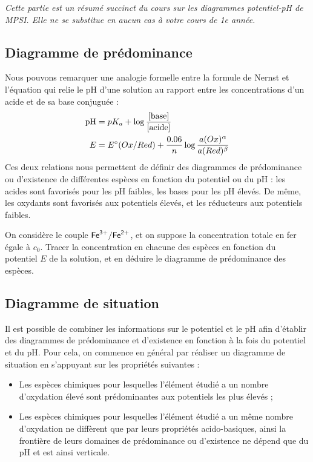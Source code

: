 \documentclass[11pt,fleqn]{book} %
\begin{document}
\textit{Cette partie est un résumé succinct du cours sur les diagrammes potentiel-pH de MPSI. Elle ne se substitue en aucun cas à votre cours de 1e année.}

\subsection{Diagramme de prédominance}

Nous pouvons remarquer une analogie formelle entre la formule de Nernst et l'équation qui relie le pH d'une solution au rapport entre les concentrations d'un acide et de sa base conjuguée :
\begin{align}
	\mathrm{pH} &= pK_a + \log \frac{[\mathrm{base}]}{[{\rm acide}]} \\
	E &= E^\circ(Ox/Red) + \frac{0.06}{n} \log \frac{ a(Ox)^\alpha}{a(Red)^\beta}
\end{align}
Ces deux relations nous permettent de définir des diagrammes de prédominance ou d'existence de différentes espèces en fonction du potentiel ou du pH : les acides sont favorisés pour les pH faibles, les bases pour les pH élevés. De même, les oxydants sont favorisés aux potentiels élevés, et les réducteurs aux potentiels faibles.

\begin{capex}
	On considère le couple $\ce{Fe^{3+}}/\ce{Fe^{2+}}$, et on suppose la concentration totale en fer égale à $c_0$. Tracer la concentration en chacune des espèces en fonction du potentiel $E$ de la solution, et en déduire le diagramme de prédominance des espèces.
\end{capex}

\subsection{Diagramme de situation}

Il est possible de combiner les informations sur le potentiel et le pH afin d'établir des diagrammes de prédominance et d'existence en fonction à la fois du potentiel et du pH. Pour cela, on commence en général par réaliser un diagramme de situation en s'appuyant sur les propriétés suivantes :
\begin{itemize}
	\item Les espèces chimiques pour lesquelles l'élément étudié a un nombre d'oxydation élevé sont prédominantes aux potentiels les plus élevés ;
	\item Les espèces chimiques pour lesquelles l'élément étudié a un même nombre d'oxydation ne diffèrent que par leurs propriétés acido-basiques, ainsi la frontière de leurs domaines de prédominance ou d'existence ne dépend que du pH et est ainsi verticale.
\end{itemize}
\end{document}
